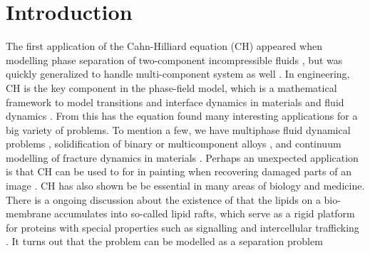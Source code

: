 \section{Introduction}\label{sec:introduction}



The first application of the Cahn-Hilliard equation (CH) appeared when modelling phase separation of two-component incompressible fluids \cite{cahn1958free, cahn1959free, cahn1961spinodal}, but was quickly generalized to handle multi-component system
as well \cite{bosch2015fractional, eyre1993systems, toth2016phase, miranville2017cahn}. In engineering, CH is the key component in
the phase-field model, which is a mathematical framework to model transitions and interface dynamics in materials and fluid dynamics \cite{steinbach2009phase, chen2002phase}.
From this has the equation found many interesting applications for a big variety of problems. To mention a few, we have
multiphase fluid dynamical problems \cite{badalassi2003computation, li2016lattice, kim2012phase, shen2010phase}, solidification of binary or multicomponent alloys \cite{kim1999phase, echebarria2004quantitative}, and continuum modelling of fracture dynamics in
materials \cite{kuhn2010continuum, li2015phase}. Perhaps an unexpected application is that CH can be used to for in painting when recovering damaged parts of an image \cite{bertozzi2006inpainting, burger2009cahn, bosch2015fractional, brkic2020image}.
CH has also shown be be essential in many areas of biology and medicine. There is a ongoing discussion about the existence of that the lipids on a bio-membrane accumulates into so-called lipid rafts, which serve as a rigid platform for proteins with
special properties such as signalling and intercellular trafficking \cite{ levental2020lipid, hancock2006lipid, munro2003lipid}. It turns out that the problem can be modelled as a separation problem \cite{miller2020divide}





